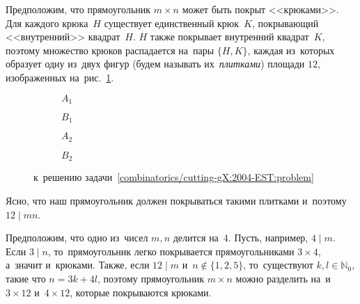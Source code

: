 \ifincludesolutions
Предположим, что прямоугольник $m \times n$ может быть покрыт <<крюками>>.
Для каждого крюка~$H$ существует единственный крюк~$K$, покрывающий
<<внутренний>> квадрат~$H$.
$H$ также покрывает внутренний квадрат~$K$, поэтому множество крюков
распадается на~пары $\{ H, K \}$, каждая из~которых образует одну из~двух фигур
(будем называть их~\emph{плитками}) площади $12$, изображенных
на~рис.~\ref{combinatorics/cutting-gX:2004-EST:solution:fig}.
\begin{figure}[ht]\begin{center}
\strut\hfill
    \begin{subfigure}{0.2\linewidth}\begin{center}
     $A_1$
    \end{center}\end{subfigure}
\hfill
    \begin{subfigure}{0.15\linewidth}\begin{center}
     $B_1$
    \end{center}\end{subfigure}
\hfill
    \begin{subfigure}{0.2\linewidth}\begin{center}
     $A_2$
    \end{center}\end{subfigure}
\hfill
    \begin{subfigure}{0.2\linewidth}\begin{center}
     $B_2$
    \end{center}\end{subfigure}
\hfill\strut
\caption{к~решению задачи~\ref{combinatorics/cutting-gX:2004-EST:problem}}%
\label{combinatorics/cutting-gX:2004-EST:solution:fig}
\end{center}\end{figure}
Ясно, что наш прямоугольник должен покрываться такими плитками и~поэтому
$12 \mid m n$.
\par
Предположим, что одно из~чисел $m, n$ делится на~4.
Пусть, например, $4 \mid m$.
Если $3 \mid n$, то~прямоугольник легко покрывается прямоугольниками
$3 \times 4$, а~значит и~крюками.
Также, если $12 \mid m$ и~$n \not\in \{1, 2, 5\}$, то~существуют
$k,l\in\mathbb{N}_0$, такие что $n=3k+4l$, поэтому прямоугольник $m\times n$
можно разделить на~и~$3\times 12$ и~$4\times 12$, которые покрываются крюками.
